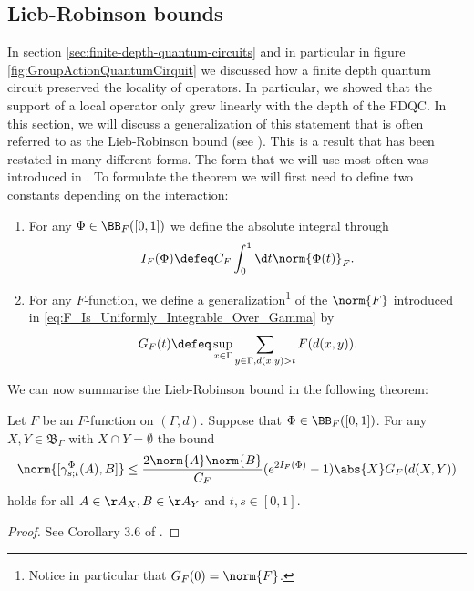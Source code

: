 \subsection{Lieb-Robinson bounds}
In section \ref{sec:finite-depth-quantum-circuits} and in particular in figure \ref{fig:GroupActionQuantumCirquit} we discussed how a finite depth quantum circuit preserved the locality of operators. In particular, we showed that the support of a local operator only grew linearly with the depth of the FDQC. In this section, we will discuss a generalization of this statement that is often referred to as the Lieb-Robinson bound (see \cite{Lieb:1972ts}). This is a result that has been restated in many different forms. The form that we will use most often was introduced in \cite{nachtergaele2019quasi}. To formulate the theorem we will first need to define two constants depending on the interaction:
\begin{enumerate}
	\item For any $\Phi\in\BB_F([0,1])$ we define the absolute integral through
	\begin{equation}
	I_F(\Phi)\defeq C_F\int_0^1 \d t \norm{\Phi(t)}_F.
	\end{equation}
	\item For any $F$-function, we define a generalization\footnote{Notice in particular that $G_F(0)=\norm{F}$.} of the $\norm{F}$ introduced in \ref{eq:F_Is_Uniformly_Integrable_Over_Gamma} by
	\begin{equation}
	G_F(t)\defeq \sup_{x\in\Gamma}\sum_{y\in\Gamma,d(x,y)>t}F(d(x,y)).
	\end{equation}
\end{enumerate}
We can now summarise the Lieb-Robinson bound in the following theorem:
\begin{theorem}
	Let $F$ be an $F$-function on $(\Gamma,d)$. Suppose that $\Phi\in\BB_F([0,1])$. For any $X,Y\in\mathfrak{B}_\Gamma$ with $X\cap Y=\emptyset$ the bound
	\begin{equation}
	\norm{[\gamma_{s;t}^{\Phi}(A),B]}\leq \frac{2\norm{A}\norm{B}}{C_F}(e^{2I_F(\Phi)}-1)\abs{X}G_F(d(X,Y))
	\end{equation}
	holds for all $A\in\AA_X,B\in\AA_Y$ and $t,s\in[0,1]$.
\end{theorem}
\begin{proof}
	See Corollary 3.6 of \cite{nachtergaele2019quasi}.
\end{proof}
